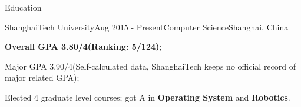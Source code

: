 \documentclass{resume} %
\begin{document}

\begin{rSection}{Education}

\begin{rSubsection}
  {ShanghaiTech University}{Aug 2015 - Present}{Computer Science}{Shanghai, China}
    \item \textbf{Overall GPA 3.80/4(Ranking: 5/124)};
    \item Major GPA 3.90/4(Self-calculated data, ShanghaiTech keeps no official record of major related GPA);
    \item Elected 4 graduate level courses; got A in \textbf{Operating System} and \textbf{Robotics}.
\end{rSubsection}

%
\end{rSection}
\end{document}
